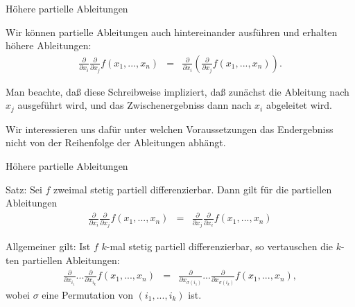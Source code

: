 \documentclass[german]{beamer}
\newcommand{\bq}{\begin{eqnarray*}}
\newcommand{\eq}{\end{eqnarray*}}
\begin{document}
\begin{frame}{H\"ohere partielle Ableitungen}

\begin{definition}
Wir k\"onnen partielle Ableitungen auch hintereinander ausf\"uhren und erhalten h\"ohere Ableitungen:
\bq
 \frac{\partial}{\partial x_i} \frac{\partial}{\partial x_j} f\left(x_1,...,x_n\right)
 & = & 
 \frac{\partial}{\partial x_i} \left( \frac{\partial}{\partial x_j} f\left(x_1,...,x_n\right) \right).
\eq
\end{definition}

Man beachte, da{\ss} diese Schreibweise impliziert, da{\ss} zun\"achst die Ableitung nach $x_j$
ausgef\"uhrt wird, und das Zwischenergebniss dann nach $x_i$ abgeleitet wird.

\vspace*{4mm}
Wir interessieren uns daf\"ur unter welchen Voraussetzungen das Endergebniss nicht von der
Reihenfolge der Ableitungen abh\"angt.

\end{frame}

\begin{frame}{H\"ohere partielle Ableitungen}

\begin{theorem}
Satz: Sei $f$ zweimal stetig partiell differenzierbar. Dann gilt f\"ur die partiellen Ableitungen
\bq
 \frac{\partial}{\partial x_i} \frac{\partial}{\partial x_j} f\left(x_1,...,x_n\right)
 & = & 
 \frac{\partial}{\partial x_j} \frac{\partial}{\partial x_i} f\left(x_1,...,x_n\right)
\eq
\end{theorem}

\begin{theorem}
Allgemeiner gilt: Ist $f$ $k$-mal stetig partiell differenzierbar, so vertauschen die $k$-ten
partiellen Ableitungen:
\bq
 \frac{\partial}{\partial x_{i_1}} ... \frac{\partial}{\partial x_{i_k}} f\left(x_1,...,x_n\right)
 & = &
 \frac{\partial}{\partial x_{\sigma(i_1)}} ... \frac{\partial}{\partial x_{\sigma(i_k)}} f\left(x_1,...,x_n\right),
\eq
wobei $\sigma$ eine Permutation von $(i_1,...,i_k)$ ist.
\end{theorem}

\end{frame}
\end{document}
